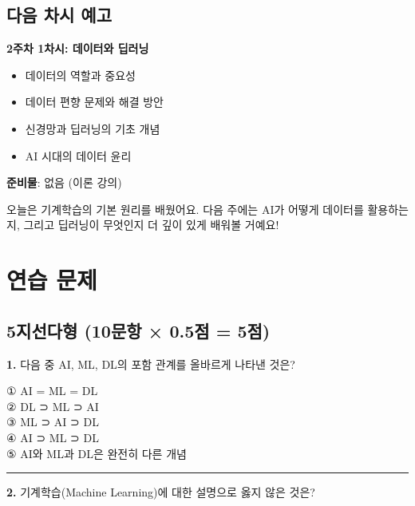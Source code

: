 \documentclass[a4paper, 11pt]{article}
\providecommand{\tightlist}{%
  \setlength{\itemsep}{0pt}\setlength{\parskip}{0pt}}
\renewenvironment{quote}
  {\begin{tcolorbox}[colback=lightblue!30, colframe=mainblue!50,
   left=8pt, right=8pt, top=4pt, bottom=4pt, breakable]}
  {\end{tcolorbox}}
\begin{document}
\hypertarget{uxb2e4uxc74c-uxcc28uxc2dc-uxc608uxace0}{%
\subsection{다음 차시
예고}\label{uxb2e4uxc74c-uxcc28uxc2dc-uxc608uxace0}}

\textbf{2주차 1차시: 데이터와 딥러닝}

\begin{itemize}
\tightlist
\item
  데이터의 역할과 중요성
\item
  데이터 편향 문제와 해결 방안
\item
  신경망과 딥러닝의 기초 개념
\item
  AI 시대의 데이터 윤리
\end{itemize}

\textbf{준비물}: 없음 (이론 강의)

\begin{quote}
 오늘은 기계학습의 기본 원리를 배웠어요. 다음 주에는 AI가 어떻게
데이터를 활용하는지, 그리고 딥러닝이 무엇인지 더 깊이 있게 배워볼
거예요!
\end{quote}

\hypertarget{uxc5f0uxc2b5-uxbb38uxc81c}{%
\section{ 연습 문제}\label{uxc5f0uxc2b5-uxbb38uxc81c}}

\hypertarget{uxc9c0uxc120uxb2e4uxd615-10uxbb38uxd56d-0.5uxc810-5uxc810}{%
\subsection{5지선다형 (10문항 × 0.5점 =
5점)}\label{uxc9c0uxc120uxb2e4uxd615-10uxbb38uxd56d-0.5uxc810-5uxc810}}

\textbf{1.} 다음 중 AI, ML, DL의 포함 관계를 올바르게 나타낸 것은?

① AI = ML = DL\\
② DL ⊃ ML ⊃ AI\\
③ ML ⊃ AI ⊃ DL\\
④ AI ⊃ ML ⊃ DL\\
⑤ AI와 ML과 DL은 완전히 다른 개념

\begin{center}\rule{0.5\linewidth}{0.5pt}\end{center}

\textbf{2.} 기계학습(Machine Learning)에 대한 설명으로 옳지 않은 것은?
\end{document}
